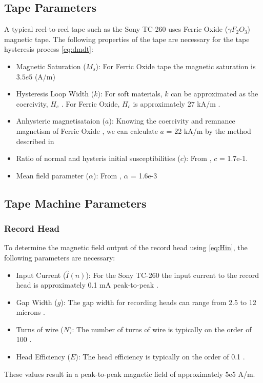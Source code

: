\documentclass[twoside,a4paper]{article}
\begin{document}
\subsection {Tape Parameters}
A typical reel-to-reel tape such as the Sony TC-260 uses 
Ferric Oxide ($\gamma F_2O_3$) magnetic tape. The following
properties of the tape are necessary for the tape hysteresis
process \cref{eq:dmdt}:
\begin{itemize}
\item Magnetic Saturation ($M_s$): For Ferric Oxide tape
the magnetic saturation is $3.5e5$ (A/m) \cite{jilesBook}
\item Hysteresis Loop Width ($k$): For soft materials, $k$ can be approximated
as the coercivity, $H_c$ \cite{Jiles1992}. For Ferric Oxide, $H_c$ is approximately
$27$ kA/m \cite{jilesBook}.
\item Anhysteric magnetisataion ($a$): Knowing the coercivity and remnance magnetism of Ferric Oxide
\cite{jilesBook}, we can calculate $a$ = 22  kA/m by the method described in
\cite{Jiles1992}
\item Ratio of normal and hysteris initial susceptibilities ($c$): From \cite{Jiles1992}, $c$ = 1.7e-1.
\item Mean field parameter ($\alpha$): From \cite{Jiles1992}, $\alpha$ = 1.6e-3
\end{itemize}

\subsection{Tape Machine Parameters}
\subsubsection {Record Head}
To determine the magnetic field output of the
record head using \cref{eq:Hin}, the following parameters 
are necessary:
\begin{itemize}
\item Input Current ($\hat{I} (n)$): For the Sony TC-260
the input current to the record head is approximately
0.1 mA peak-to-peak \cite{RefManual}.
\item Gap Width ($g$): The gap width for recording heads
can range from 2.5 to 12 microns \cite{Kadis}.
\item Turns of wire ($N$): The number of turns of wire
is typically on the order of 100 \cite{1994tmr..book.....B}.
\item Head Efficiency ($E$): The head efficiency is typically
on the order of 0.1 \cite{1994tmr..book.....B}.
\end{itemize}
%
These values result in a peak-to-peak magnetic field
of approximately 5e5 A/m.
\end{document}
